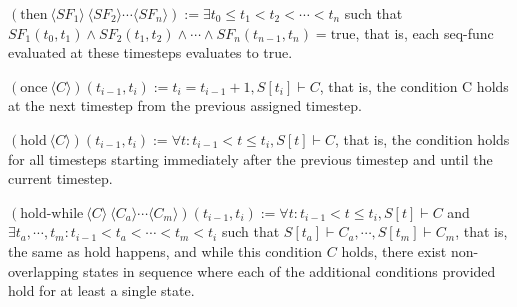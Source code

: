 \documentclass{article}
\begin{document}
$(\text{then}\ \langle SF_1 \rangle \ \langle SF_2 \rangle \cdots \langle SF_n \rangle) := \exists t_0 \leq t_1 < t_2 < \cdots < t_n$ such that $SF_1(t_0, t_1) \land SF_2(t_1, t_2) \land \cdots \land SF_n(t_{n-1}, t_n) = \text{true}$, that is, each seq-func evaluated at these timesteps evaluates to true. 

$(\text{once}\ \langle C \rangle)(t_{i-1}, t_i) := t_i = t_{i-1} + 1, S[t_i] \vdash C$, that is, the condition C holds at the next timestep from the previous assigned timestep.

$(\text{hold}\ \langle C \rangle)(t_{i-1}, t_i) := \forall t:  t_{i-1} < t \leq t_i, S[t] \vdash C$, that is, the condition holds for all timesteps starting immediately after the previous timestep and until the current timestep. 

$(\text{hold-while}\ \langle C \rangle \ \langle C_a \rangle \cdots \langle C_m \rangle)(t_{i-1}, t_i) := \forall t:  t_{i-1} < t \leq t_i, S[t] \vdash C$ and $\exists t_a, \cdots, t_m: t_{i-1} < t_a < \cdots < t_m < t_i$ such that $S[t_a] \vdash C_a, \cdots, S[t_m] \vdash C_m$, that is, the same as hold happens, and while this condition $C$ holds, there exist non-overlapping states in sequence where each of the additional conditions provided hold for at least a single state.


\end{document}
